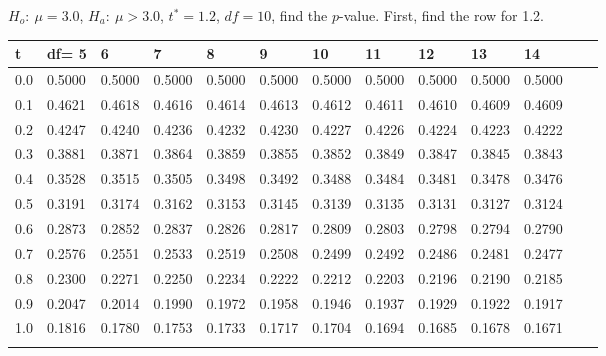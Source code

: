\begin{frame}{\small $H_o:~\mu=3.0$, $H_a:~\mu>3.0$, $t^*=1.2$,
    $df=10$, find the $p$-value.}
{\small First, find the row for 1.2.}  
  {
\fontsize{5pt}{5pt}
\selectfont

\begin{tabular}{l|llllllllllll} 
t  & df= 5  &  6  &  7  &  8  &  9  &  10  &  11  &  12  &  13  &  14     \\\hline 
 0.0 & 0.5000 & 0.5000 & 0.5000 & 0.5000 & 0.5000 & 0.5000 & 0.5000 & 0.5000 & 0.5000 & 0.5000  \\[5pt] \arrayrulecolor{light-gray}\hline\arrayrulecolor{black}  
 0.1 & 0.4621 & 0.4618 & 0.4616 & 0.4614 & 0.4613 & 0.4612 & 0.4611 & 0.4610 & 0.4609 & 0.4609  \\[5pt] \arrayrulecolor{light-gray}\hline\arrayrulecolor{black}  
 0.2 & 0.4247 & 0.4240 & 0.4236 & 0.4232 & 0.4230 & 0.4227 & 0.4226 & 0.4224 & 0.4223 & 0.4222  \\[5pt] \arrayrulecolor{light-gray}\hline\arrayrulecolor{black}  
 0.3 & 0.3881 & 0.3871 & 0.3864 & 0.3859 & 0.3855 & 0.3852 & 0.3849 & 0.3847 & 0.3845 & 0.3843  \\[5pt] \arrayrulecolor{light-gray}\hline\arrayrulecolor{black}  
 0.4 & 0.3528 & 0.3515 & 0.3505 & 0.3498 & 0.3492 & 0.3488 & 0.3484 & 0.3481 & 0.3478 & 0.3476  \\[5pt] \arrayrulecolor{light-gray}\hline\arrayrulecolor{black}  
 0.5 & 0.3191 & 0.3174 & 0.3162 & 0.3153 & 0.3145 & 0.3139 & 0.3135 & 0.3131 & 0.3127 & 0.3124  \\[5pt] \arrayrulecolor{light-gray}\hline\arrayrulecolor{black}  
 0.6 & 0.2873 & 0.2852 & 0.2837 & 0.2826 & 0.2817 & 0.2809 & 0.2803 & 0.2798 & 0.2794 & 0.2790  \\[5pt] \arrayrulecolor{light-gray}\hline\arrayrulecolor{black}  
 0.7 & 0.2576 & 0.2551 & 0.2533 & 0.2519 & 0.2508 & 0.2499 & 0.2492 & 0.2486 & 0.2481 & 0.2477  \\[5pt] \arrayrulecolor{light-gray}\hline\arrayrulecolor{black}  
 0.8 & 0.2300 & 0.2271 & 0.2250 & 0.2234 & 0.2222 & 0.2212 & 0.2203 & 0.2196 & 0.2190 & 0.2185  \\[5pt] \arrayrulecolor{light-gray}\hline\arrayrulecolor{black}  
 0.9 & 0.2047 & 0.2014 & 0.1990 & 0.1972 & 0.1958 & 0.1946 & 0.1937 & 0.1929 & 0.1922 & 0.1917  \\[5pt] \arrayrulecolor{light-gray}\hline\arrayrulecolor{black}  
 1.0 & 0.1816 & 0.1780 & 0.1753 & 0.1733 & 0.1717 & 0.1704 & 0.1694 & 0.1685 & 0.1678 & 0.1671  \\[5pt] \arrayrulecolor{light-gray}\hline\arrayrulecolor{black}  

\end{tabular}}
\end{frame}
